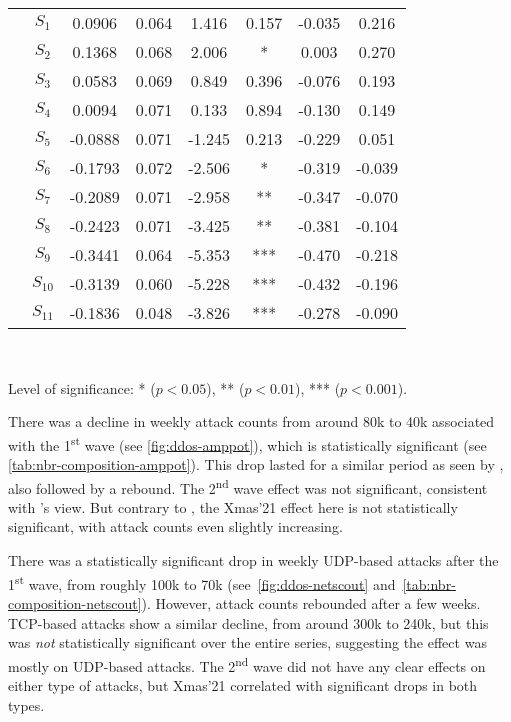 \documentclass[letterpaper,twocolumn,10pt]{article}
\begin{document}
\begin{table}[ht!]
\begin{tabular}{lccccccc}
    & $S_{1}$ &  0.0906 &   0.064 &   1.416 &   0.157 &   -0.035 &    0.216\\
    & $S_{2}$ &  0.1368 &   0.068 &   2.006 &   * &    0.003 &    0.270\\
    & $S_{3}$ &  0.0583 &   0.069 &   0.849 &   0.396 &   -0.076 &    0.193\\
    & $S_{4}$ &   0.0094 &   0.071 &   0.133 &   0.894 &   -0.130 &    0.149\\
    & $S_{5}$ &  -0.0888 &   0.071 &  -1.245 &   0.213 &   -0.229 &    0.051\\
    & $S_{6}$ &  -0.1793 &   0.072 &  -2.506 &   * &   -0.319 &   -0.039\\
    & $S_{7}$ &   -0.2089 &   0.071 &  -2.958 &   ** &   -0.347 &   -0.070\\
    & $S_{8}$ & -0.2423 &   0.071 &  -3.425 &   ** &   -0.381 &   -0.104\\
    & $S_{9}$ &  -0.3441 &   0.064 &  -5.353 &   *** &   -0.470 &   -0.218\\
    & $S_{10}$ & -0.3139 &   0.060 &  -5.228 &   *** &   -0.432 &   -0.196\\
    & $S_{11}$ & -0.1836 &   0.048 &  -3.826 &   *** &   -0.278 &   -0.090\\
    \bottomrule
\end{tabular}
\\{\vspace{1mm}\hspace{2mm}\raggedright 
\footnotesize{Level of significance: * ($p < 0.05$), ** ($p < 0.01$), *** ($p < 0.001$).} \par}
\label{tab:nbr-composition-netscout}
\end{table}
 There was a decline in weekly attack counts from around 80k to 40k associated with the 1\textsuperscript{st} wave (see \autoref{fig:ddos-amppot}), which is statistically significant (see \autoref{tab:nbr-composition-amppot}). This drop lasted for a similar period as seen by \hopscotch, also followed by a rebound. The 2\textsuperscript{nd} wave effect was not significant, consistent with \hopscotch's view. But contrary to \hopscotch, the Xmas'21 effect here is not statistically significant, with attack counts even slightly increasing.

 There was a statistically significant drop in weekly UDP-based attacks after the 1\textsuperscript{st} wave, from roughly 100k to 70k (see~\autoref{fig:ddos-netscout} and~\autoref{tab:nbr-composition-netscout}). However, attack counts rebounded after a few weeks. TCP-based attacks show a similar decline, from around 300k to 240k, but this was \textit{not} statistically significant over the entire series, suggesting the effect was mostly on UDP-based attacks. The 2\textsuperscript{nd} wave did not have any clear effects on either type of attacks, but Xmas'21 correlated with significant drops in both types.
\end{document}
